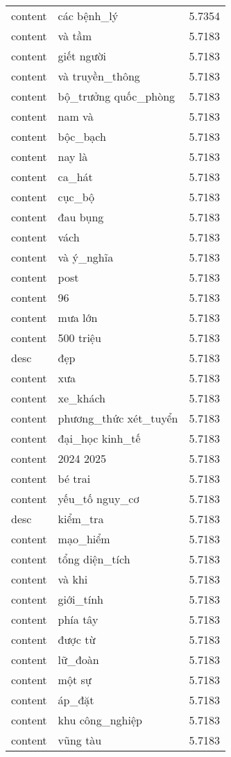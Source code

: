 \documentclass{article}
\begin{document}
\begin{tabular}{lll}
content & các bệnh\_lý & 5.7354\\
content & và tầm & 5.7183\\
content & giết người & 5.7183\\
content & và truyền\_thông & 5.7183\\
content & bộ\_trưởng quốc\_phòng & 5.7183\\
content & nam và & 5.7183\\
content & bộc\_bạch & 5.7183\\
content & nay là & 5.7183\\
content & ca\_hát & 5.7183\\
content & cục\_bộ & 5.7183\\
content & đau bụng & 5.7183\\
content & vách & 5.7183\\
content & và ý\_nghĩa & 5.7183\\
content & post & 5.7183\\
content & 96 & 5.7183\\
content & mưa lớn & 5.7183\\
content & 500 triệu & 5.7183\\
desc & đẹp & 5.7183\\
content & xưa & 5.7183\\
content & xe\_khách & 5.7183\\
content & phương\_thức xét\_tuyển & 5.7183\\
content & đại\_học kinh\_tế & 5.7183\\
content & 2024 2025 & 5.7183\\
content & bé trai & 5.7183\\
content & yếu\_tố nguy\_cơ & 5.7183\\
desc & kiểm\_tra & 5.7183\\
content & mạo\_hiểm & 5.7183\\
content & tổng diện\_tích & 5.7183\\
content & và khi & 5.7183\\
content & giới\_tính & 5.7183\\
content & phía tây & 5.7183\\
content & được từ & 5.7183\\
content & lữ\_đoàn & 5.7183\\
content & một sự & 5.7183\\
content & áp\_đặt & 5.7183\\
content & khu công\_nghiệp & 5.7183\\
content & vũng tàu & 5.7183\\

\end{tabular}
\end{document}

